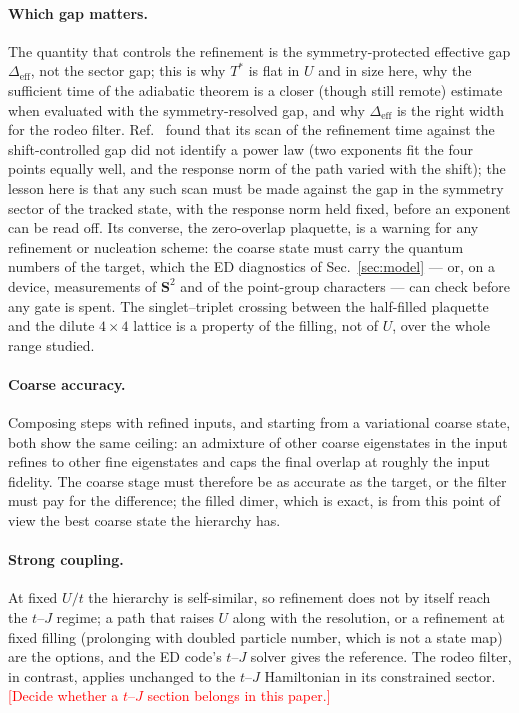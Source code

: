 \documentclass[
  aps,
  prc,
  reprint,
  superscriptaddress,
  floatfix,
  nofootinbib
]{revtex4-2}
\newcommand{\todo}[1]{\textcolor{red}{[#1]}}
\newcommand{\Deff}{\Delta_{\mathrm{eff}}}
\begin{document}
\paragraph{Which gap matters.}
The quantity that controls the refinement is the symmetry-protected
effective gap $\Deff$, not the sector gap; this is why $T^*$ is flat in $U$
and in size here, why the sufficient time of the adiabatic theorem is a
closer (though still remote) estimate when evaluated with the symmetry-resolved
gap, and why $\Deff$ is the right width for the rodeo filter.
Ref.~\cite{EigenQPairing2026} found that its scan of the refinement time
against the shift-controlled gap did not identify a power law (two
exponents fit the four points equally well, and the response norm of the
path varied with the shift); the lesson here is that any such scan must be
made against the gap in the symmetry sector of the tracked state, with the
response norm held fixed, before an exponent can be read off.  Its
converse, the zero-overlap plaquette, is a warning for any refinement or
nucleation scheme: the coarse state must carry the quantum numbers of the
target, which the ED diagnostics of Sec.~\ref{sec:model} --- or, on a device,
measurements of $\mathbf S^2$ and of the point-group characters --- can
check before any gate is spent.  The singlet--triplet crossing between the
half-filled plaquette and the dilute $4\times4$ lattice is a property of the
filling, not of $U$, over the whole range studied.

\paragraph{Coarse accuracy.}
Composing steps with refined inputs, and starting from a variational coarse
state, both show the same ceiling: an admixture of other coarse eigenstates
in the input refines to other fine eigenstates and caps the final overlap
at roughly the input fidelity.  The coarse stage must therefore be as
accurate as the target, or the filter must pay for the difference; the
filled dimer, which is exact, is from this point of view the best coarse
state the hierarchy has.

\paragraph{Strong coupling.}
At fixed $U/t$ the hierarchy is self-similar, so refinement does not by
itself reach the $t$--$J$ regime; a path that raises $U$ along with the
resolution, or a refinement at fixed filling (prolonging with doubled
particle number, which is not a state map) are the options, and the ED
code's $t$--$J$ solver gives the reference.  The rodeo filter, in contrast,
applies unchanged to the $t$--$J$ Hamiltonian in its constrained sector.
\todo{Decide whether a $t$--$J$ section belongs in this paper.}
\end{document}
